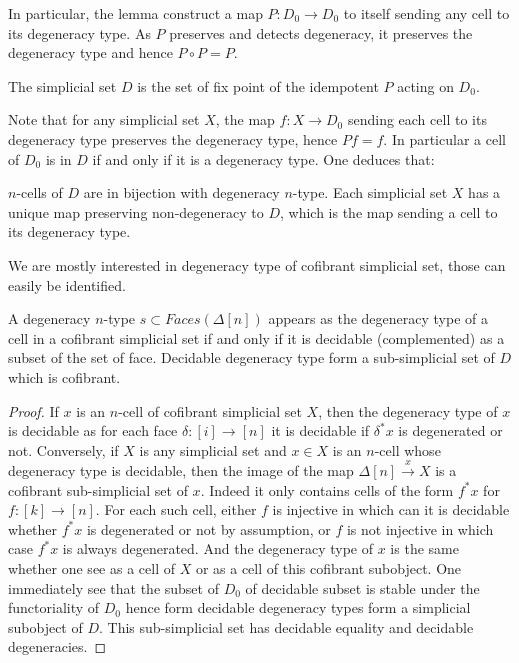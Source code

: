 \documentclass[reqno,10pt,a4paper,oneside,draft]{amsart}
\begin{document}
In particular, the lemma construct a map $P:D_0 \rightarrow D_0$ to itself sending any cell to its degeneracy type. As $P$ preserves and detects degeneracy, it preserves the degeneracy type and hence $P \circ P =P$.

\begin{definition}
The simplicial set $D$ is the set of fix point of the idempotent $P$ acting on $D_0$.
\end{definition}

Note that for any simplicial set $X$, the map $f:X \rightarrow D_0$ sending each cell to its degeneracy type preserves the degeneracy type, hence $P f = f$. In particular a cell of $D_0$ is in $D$ if and only if it is a degeneracy type. One deduces that:

\begin{lemma}
$n$-cells of $D$ are in bijection with degeneracy $n$-type. Each simplicial set $X$ has a unique map preserving non-degeneracy to $D$, which is the map sending a cell to its degeneracy type.
\end{lemma}




We are mostly interested in degeneracy type of cofibrant simplicial set, those can easily be identified.

\begin{lemma}
A degeneracy $n$-type $s \subset Faces(\Delta[n])$ appears as the degeneracy type of a cell in a cofibrant simplicial set if and only if it is decidable (complemented) as a subset of the set of face. Decidable degeneracy type form a sub-simplicial set of $D$ which is cofibrant.
\end{lemma}

\begin{proof}
If $x$ is an $n$-cell of cofibrant simplicial set $X$, then the degeneracy type of $x$ is decidable as for each face $\delta:[i] \rightarrow [n]$ it is decidable if $\delta^* x $ is degenerated or not.
Conversely, if $X$ is any simplicial set and $x \in X$ is an $n$-cell whose degeneracy type is decidable, then the image of the map $\Delta[n] \overset{x}{\rightarrow} X$ is a cofibrant sub-simplicial set of $x$. Indeed it only contains cells of the form $f^*x$ for $f:[k] \rightarrow [n]$. For each such cell, either $f$ is injective in which can it is decidable whether $f^*x$ is degenerated or not by assumption, or $f$ is not injective in which case $f^*x$ is always degenerated. And the degeneracy type of $x$ is the same whether one see as a cell of $X$ or as a cell of this cofibrant subobject.
One immediately see that the subset of $D_0$ of decidable subset is stable under the functoriality of $D_0$ hence form decidable degeneracy types form a simplicial subobject of $D$. This sub-simplicial set has decidable equality and decidable degeneracies.
\end{proof}
\end{document}
